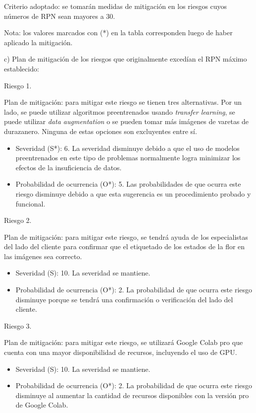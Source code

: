 \documentclass[
11pt, %
codirector, %
]{charter}
\begin{document}
Criterio adoptado: 
se tomarán medidas de mitigación en los riesgos cuyos números de RPN sean mayores a 30.

Nota: los valores marcados con (*) en la tabla corresponden luego de haber aplicado la mitigación.

c) Plan de mitigación de los riesgos que originalmente excedían el RPN máximo establecido:

Riesgo 1. 

Plan de mitigación: para mitigar este riesgo se tienen tres alternativas. Por un lado, se puede utilizar algoritmos preentrenados usando \textit{transfer learning}, se puede utilizar \textit{data augmentation} o se pueden tomar más imágenes de varetas de durazanero. Ninguna de estas opciones son excluyentes entre sí.

\begin{itemize}
\item Severidad (S*): 6. La severidad disminuye debido a que el uso de modelos preentrenados en este tipo de problemas normalmente logra minimizar los efectos de la insuficiencia de datos.

\item Probabilidad de ocurrencia (O*): 5. Las probabilidades de que ocurra este riesgo disminuye debido a que esta sugerencia es un procedimiento probado y funcional. 
\end{itemize}

Riesgo 2. 

Plan de mitigación: para mitigar este riesgo, se tendrá ayuda de los especialistas del lado del cliente para confirmar que el etiquetado de los estados de la flor en las imágenes sea correcto.

\begin{itemize}
\item Severidad (S): 10. La severidad se mantiene.

\item Probabilidad de ocurrencia (O*): 2. La probabilidad de que ocurra este riesgo disminuye porque se tendrá una confirmación o verificación del lado del cliente. 
\end{itemize}

Riesgo 3. 

Plan de mitigación: para mitigar este riesgo, se utilizará Google Colab pro que cuenta con una mayor disponibilidad de recursos, incluyendo el uso de GPU.

\begin{itemize}
\item Severidad (S): 10. La severidad se mantiene.

\item Probabilidad de ocurrencia (O*): 2. La probabilidad de que ocurra este riesgo disminuye al aumentar la cantidad de recursos disponibles con la versión pro de Google Colab. 
\end{itemize}
\end{document}
